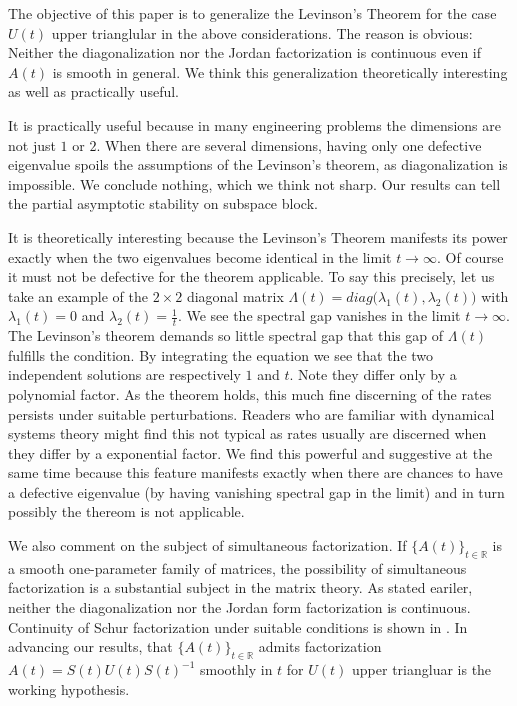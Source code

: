 \documentclass[a4paper,11pt]{article}
\newcounter{Theorem}
\theoremstyle{remark}
\begin{document}
The objective of this paper is to generalize the Levinson's Theorem for the case $U(t)$ upper trianglular in the above considerations. The reason is obvious: Neither the diagonalization nor the Jordan factorization is continuous even if $A(t)$ is smooth in general. We think this generalization theoretically interesting as well as practically useful. 

It is practically useful because in many engineering problems the dimensions are not just $1$ or $2$. When there are several dimensions, having only one defective eigenvalue spoils the assumptions of the Levinson's theorem, as diagonalization is impossible. We conclude nothing, which we think not sharp. Our results can tell the partial asymptotic stability on subspace block.

It is theoretically interesting because the Levinson's Theorem manifests its power exactly when the two eigenvalues become identical in the limit $t \rightarrow \infty$. Of course it must not be defective for the theorem applicable. To say this precisely, let us take an example of the $2\times 2$ diagonal matrix $\Lambda(t) = diag\big(\lambda_1(t),\lambda_2(t)\big)$ with $\lambda_1(t) = 0$ and $\lambda_2(t) = \frac{1}{t}$. We see the spectral gap vanishes in the limit $t \rightarrow \infty$. The Levinson's theorem demands so little spectral gap that this gap of $\Lambda(t)$ fulfills the condition. By integrating the equation we see that the two independent solutions are respectively $1$ and $t$. Note they differ only by a polynomial factor. As the theorem holds, this much fine discerning of the rates persists under suitable perturbations. Readers who are familiar with dynamical systems theory might find this not typical as rates usually are discerned when they differ by a exponential factor. We find this powerful and suggestive at the same time because this feature manifests exactly when there are chances to have a defective eigenvalue (by having vanishing spectral gap in the limit) and in turn possibly the thereom is not applicable.


We also comment on the subject of simultaneous factorization. If $\{A(t)\}_{t\in \mathbb{R}}$ is a smooth one-parameter family of matrices, the possibility of simultaneous factorization is a substantial subject in the matrix theory. As stated eariler, neither the diagonalization nor the Jordan form factorization is continuous.  Continuity of Schur factorization under suitable conditions is shown in \cite{DE99}. In advancing our results, that $\{A(t)\}_{t\in \mathbb{R}}$ admits factorization $A(t) =  S(t)U(t)S(t)^{-1}$ smoothly in $t$ for $U(t)$ upper triangluar is the working hypothesis. 
\end{document}

